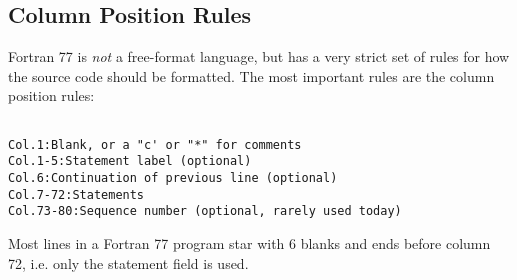 \documentclass[oneside]{article}
\begin{document}
\subsection*{Column Position Rules}

Fortran 77 is \textit{not} a free-format language, but has a very strict set of rules for how the source code should be formatted. The most important rules are the column position rules:

\begin{lstlisting}
 
Col.1:Blank, or a "c' or "*" for comments
Col.1-5:Statement label (optional) 
Col.6:Continuation of previous line (optional)
Col.7-72:Statements
Col.73-80:Sequence number (optional, rarely used today)
\end{lstlisting}
 Most lines in a Fortran 77 program star with 6 blanks and ends before column 72, i.e. only the statement field is used. 
\end{document}
